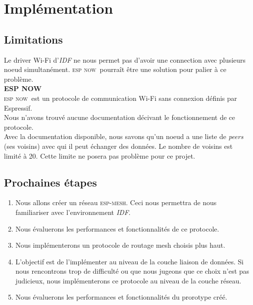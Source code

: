 \documentclass[a4paper, 12pt]{report}
\newcommand{\espmesh}{\textsc{esp-mesh}}
\newcommand{\espnow}{\textsc{esp now}}
\begin{document}
\chapter{Implémentation}
\section{Limitations}
        Le driver Wi-Fi d'\textit{IDF} ne nous permet pas d'avoir une connection
        avec plusieurs noeud simultanément. \espnow\ pourraît être une solution
        pour palier à ce problème.\\
    
    
        \textbf{ESP NOW}\\
            \espnow\ est un protocole de communication Wi-Fi sans connexion définis par Espressif.\\
            Nous n'avons trouvé aucune documentation décivant le fonctionnement de ce protocole.\\
            Avec la documentation disponible, nous savons qu'un noeud a une liste de \textit{peers} (ses voisins) avec qui il peut échanger des données.
            Le nombre de voisins est limité à 20. Cette limite ne posera pas problème pour ce projet.
        

\section{Prochaines étapes}
        \begin{enumerate}
            \item Nous allons créer un réseau \espmesh. Ceci nous permettra de nous
            familiariser avec l'environnement \textit{IDF}.
            \item Nous évaluerons les performances et fonctionnalités de ce protocole.
            \item Nous implémenterons un protocole de routage mesh choisis plus haut.
            \item L'objectif est de l'implémenter au niveau de la couche liaison de données.
                Si nous rencontrons trop de difficulté ou que nous jugeons que ce choix n'est pas judicieux,
                nous implémenterons ce protocole au niveau de la couche réseau.
            \item Nous évaluerons les performances et fonctionnalités du prorotype créé. 
            
        \end{enumerate}

{}

\end{document}
